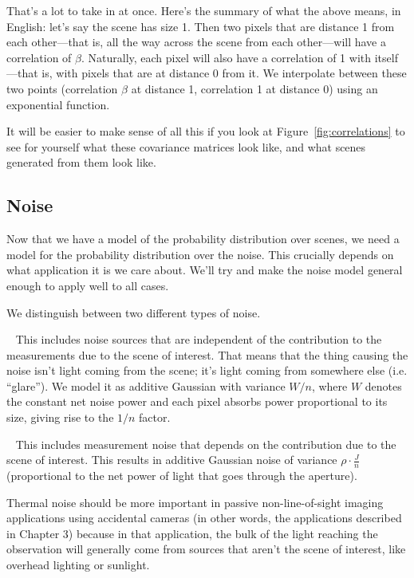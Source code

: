 That's a lot to take in at once. Here's the summary of what the above means, in English: let's say the scene has size 1. Then two pixels that are distance 1 from each other---that is, all the way across the scene from each other---will have a correlation of $\beta$. Naturally, each pixel will also have a correlation of 1 with itself---that is, with pixels that are at distance 0 from it. We interpolate between these two points (correlation $\beta$ at distance 1, correlation 1 at distance 0) using an exponential function.

It will be easier to make sense of all this if you look at Figure~\ref{fig:correlations} to see for yourself what these covariance matrices look like, and what scenes generated from them look like.

\subsection{Noise}

Now that we have a model of the probability distribution over scenes, we need a model for the probability distribution over the noise. This crucially depends on what application it is we care about. We'll try and make the noise model general enough to apply well to all cases.

We distinguish between two different types of noise.

~
This includes noise sources that are independent of the contribution to the measurements due to the scene of interest. That means that the thing causing the noise isn't light coming from the scene; it's light coming from somewhere else (i.e. ``glare''). We model it as additive Gaussian with variance $W/n$, where $W$ denotes the constant net noise power and each pixel absorbs power proportional to its size, giving rise to the $1/n$ factor. 

~
This includes measurement noise that depends on the contribution due to the scene of interest. This results in additive Gaussian noise of variance  $\rho\cdot\frac{J}{n}$ (proportional to the net power of light that goes through the aperture). 

Thermal noise should be more important in passive non-line-of-sight imaging applications using accidental cameras (in other words, the applications described in Chapter 3) because in that application, the bulk of the light reaching the observation will generally come from sources that aren't the scene of interest, like overhead lighting or sunlight.

